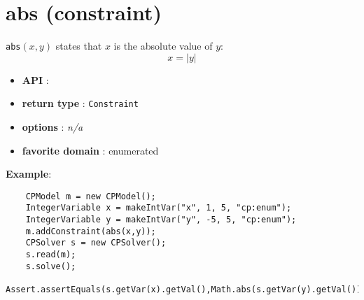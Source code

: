 \section{abs (constraint)}\label{abs:absconstraint}\hypertarget{abs:absconstraint}{}
\begin{notedef}
  \texttt{abs}$(x,y)$ states that $x$ is the absolute value of $y$:
$$x = |y|$$
\end{notedef}

\begin{itemize}
	\item \textbf{API} : 
	\item \textbf{return type} : \texttt{Constraint}
	\item \textbf{options} : \emph{n/a}
	\item \textbf{favorite domain} : enumerated
\end{itemize}

\textbf{Example}:
\begin{lstlisting}
	CPModel m = new CPModel();
	IntegerVariable x = makeIntVar("x", 1, 5, "cp:enum");
	IntegerVariable y = makeIntVar("y", -5, 5, "cp:enum");
	m.addConstraint(abs(x,y));
	CPSolver s = new CPSolver();
	s.read(m);
	s.solve();
	Assert.assertEquals(s.getVar(x).getVal(),Math.abs(s.getVar(y).getVal()));
\end{lstlisting}


